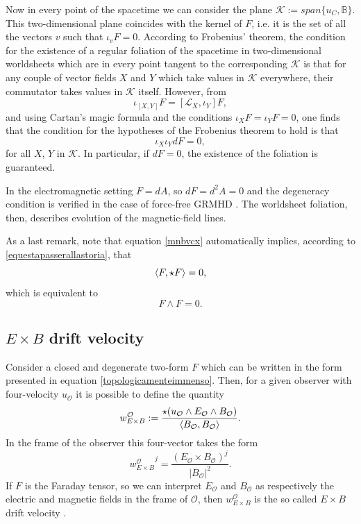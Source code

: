 \documentclass[usenatbib%
]{mnras}
\begin{document}
Now in every point of the spacetime we can consider the plane $\mathcal{K}:= span \{u_C,\mathbb{B} \}$. This two-dimensional plane coincides with the kernel of $F$, i.e. it is the set of all the vectors $v$ such that $\iota_v F=0$. 
According to Frobenius' theorem, the condition for the existence of a regular foliation of the spacetime in two-dimensional worldsheets which are in every point tangent to the corresponding $\mathcal{K}$ is that for any couple of vector fields $X$ and $Y$ which take values in $\mathcal{K}$ everywhere, their commutator takes values in $\mathcal{K}$ itself. However, from
\begin{equation}
\iota_{[X,Y]} F = [\mathcal{L}_X , \iota_Y] F,
\end{equation}
and using Cartan's magic formula and the conditions $\iota_X F = \iota_Y F=0$, one finds that the condition for the hypotheses of the Frobenius theorem to hold is that 
\begin{equation}
\iota_X \iota_Y dF=0,
\end{equation}
for all $X$, $Y$ in $\mathcal{K}$. In particular, if $dF=0$, the existence of the foliation is guaranteed. 

In the electromagnetic setting $F=dA$, so $dF=d^2A=0$ and the degeneracy condition is verified in the case of force-free GRMHD \citep{Gralla_jacobson2014}. The worldsheet foliation, then, describes evolution of the magnetic-field lines. 

As a last remark, note that equation \eqref{mnbvcx} automatically implies, according to \eqref{equestapasserallastoria}, that
\begin{equation}
\braket{F,{\star}F}=0,
\end{equation}
which is equivalent to
\begin{equation}
F \wedge F =0.
\end{equation}

\subsection{$E \times B$ drift velocity}\label{sec:drift}

Consider a closed and degenerate two-form $F$ which can be written in the form presented in equation \eqref{topologicamenteimmenso}. Then, for a given observer with four-velocity $u_\mathcal{O}$ it is possible to define the quantity
\begin{equation}\label{sonoalcamk}
w_{E\times B}^{\mathcal{O}} :=  \dfrac{\star (u_\mathcal{O} \wedge E_\mathcal{O} \wedge B_\mathcal{O})}{\braket{B_\mathcal{O},B_\mathcal{O}}}.
\end{equation}
In the frame of the observer this four-vector takes the form
\begin{equation}
{w_{E\times B}^{\mathcal{O}}}^j = \dfrac{(E_\mathcal{O} \times B_\mathcal{O})^j}{|B_\mathcal{O}|^2}.
\end{equation} 
If $F$ is the Faraday tensor, so we can interpret $E_\mathcal{O}$ and $B_\mathcal{O}$ as respectively the electric and magnetic fields in the frame of $\mathcal{O}$, then $w_{E\times B}^{\mathcal{O}}$ is the so called $E \times B$ drift velocity \citep{bellan_2006}. 
\end{document}
